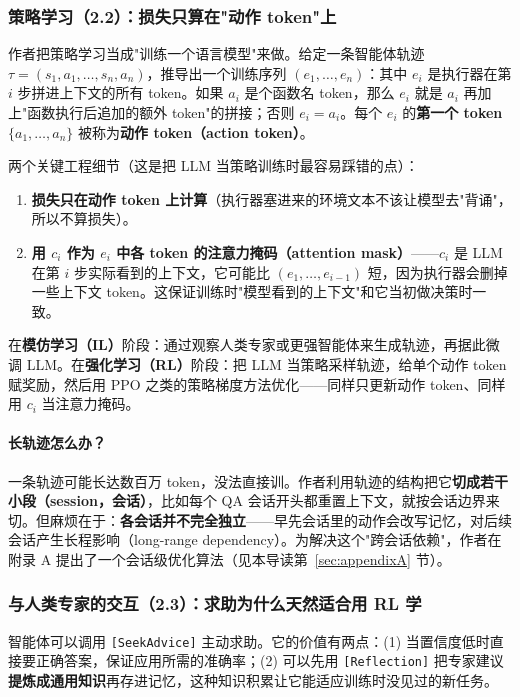 \documentclass[11pt,UTF8,fontset=fandol]{ctexart}
\begin{document}
\subsubsection{策略学习（2.2）：损失只算在"动作 token"上}

作者把策略学习当成"训练一个语言模型"来做。给定一条智能体轨迹 $\tau = (s_1,a_1,\dots,s_n,a_n)$，推导出一个训练序列 $(e_1,\dots,e_n)$：其中 $e_i$ 是执行器在第 $i$ 步拼进上下文的所有 token。如果 $a_i$ 是个函数名 token，那么 $e_i$ 就是 $a_i$ 再加上"函数执行后追加的额外 token"的拼接；否则 $e_i = a_i$。每个 $e_i$ 的\textbf{第一个 token} $\{a_1,\dots,a_n\}$ 被称为\textbf{动作 token（action token）}。

两个关键工程细节（这是把 LLM 当策略训练时最容易踩错的点）：
\begin{enumerate}[leftmargin=1.8em]
\item \textbf{损失只在动作 token 上计算}（执行器塞进来的环境文本不该让模型去"背诵"，所以不算损失）。
\item \textbf{用 $c_i$ 作为 $e_i$ 中各 token 的注意力掩码（attention mask）}——$c_i$ 是 LLM 在第 $i$ 步实际看到的上下文，它可能比 $(e_1,\dots,e_{i-1})$ 短，因为执行器会删掉一些上下文 token。这保证训练时"模型看到的上下文"和它当初做决策时一致。
\end{enumerate}

在\textbf{模仿学习（IL）}阶段：通过观察人类专家或更强智能体来生成轨迹，再据此微调 LLM。在\textbf{强化学习（RL）}阶段：把 LLM 当策略采样轨迹，给单个动作 token 赋奖励，然后用 PPO 之类的策略梯度方法优化——同样只更新动作 token、同样用 $c_i$ 当注意力掩码。

\paragraph{长轨迹怎么办？} 一条轨迹可能长达数百万 token，没法直接训。作者利用轨迹的结构把它\textbf{切成若干小段（session，会话）}，比如每个 QA 会话开头都重置上下文，就按会话边界来切。但麻烦在于：\textbf{各会话并不完全独立}——早先会话里的动作会改写记忆，对后续会话产生长程影响（long-range dependency）。为解决这个"跨会话依赖"，作者在附录 A 提出了一个会话级优化算法（见本导读第~\ref{sec:appendixA} 节）。

\subsubsection{与人类专家的交互（2.3）：求助为什么天然适合用 RL 学}

智能体可以调用 \texttt{[SeekAdvice]} 主动求助。它的价值有两点：(1) 当置信度低时直接要正确答案，保证应用所需的准确率；(2) 可以先用 \texttt{[Reflection]} 把专家建议\textbf{提炼成通用知识}再存进记忆，这种知识积累让它能适应训练时没见过的新任务。
\end{document}
